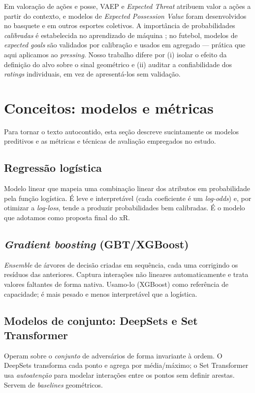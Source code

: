 \documentclass[a4paper,11pt]{article}
\begin{document}
Em valoração de ações e posse, VAEP \citep{decroos2019vaep} e \emph{Expected Threat} \citep{singh2019xt} atribuem valor a ações a partir do contexto, e modelos de \emph{Expected Possession Value} foram desenvolvidos no basquete \citep{cervone2016epv} e em outros esportes coletivos. A importância de probabilidades \emph{calibradas} é estabelecida no aprendizado de máquina \citep{niculescu2005calibration}; no futebol, modelos de \emph{expected goals} são validados por calibração e usados em agregado \citep{anzer2021xg} --- prática que aqui aplicamos ao \emph{pressing}. Nosso trabalho difere por (i) isolar o efeito da definição do alvo sobre o sinal geométrico e (ii) auditar a confiabilidade dos \emph{ratings} individuais, em vez de apresentá-los sem validação.

\section{Conceitos: modelos e métricas}\label{sec:conceitos}

Para tornar o texto autocontido, esta seção descreve sucintamente os modelos preditivos e as métricas e técnicas de avaliação empregados no estudo.

\subsection{Regressão logística}
Modelo linear que mapeia uma combinação linear dos atributos em probabilidade pela função logística. É leve e interpretável (cada coeficiente é um \emph{log-odds}) e, por otimizar a \emph{log-loss}, tende a produzir probabilidades bem calibradas. É o modelo que adotamos como proposta final do xR.

\subsection{\emph{Gradient boosting} (GBT/XGBoost)}
\emph{Ensemble} de árvores de decisão criadas em sequência, cada uma corrigindo os resíduos das anteriores. Captura interações não lineares automaticamente e trata valores faltantes de forma nativa. Usamo-lo (XGBoost) como referência de capacidade; é mais pesado e menos interpretável que a logística.

\subsection{Modelos de conjunto: DeepSets e Set Transformer}
Operam sobre o \emph{conjunto} de adversários de forma invariante à ordem. O DeepSets transforma cada ponto e agrega por média/máximo; o Set Transformer usa \emph{autoatenção} para modelar interações entre os pontos sem definir arestas. Servem de \emph{baselines} geométricos.
\end{document}
